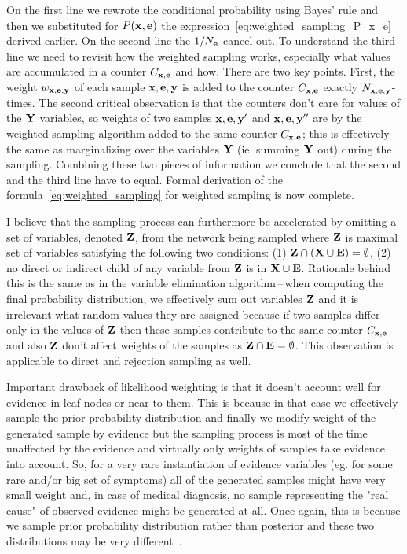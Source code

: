 \documentclass[english,cover]{fitthesis} %
\newcommand{\vars}[1]{{\bold{#1}}}         %
\begin{document}
On the first line we rewrote the conditional probability using Bayes' rule and then we substituted for $P(\vars{x},\vars{e})$ the expression~\eqref{eq:weighted_sampling_P_x_e} derived earlier.
On the second line the $1/N_\vars{e}$ cancel out.
To understand the third line we need to revisit how the weighted sampling works, especially what values are accumulated in a counter $C_{\vars{x},\vars{e}}$ and how. There are two key points. First, the weight $w_{\vars{x},\vars{e},\vars{y}}$ of each sample $\vars{x},\vars{e},\vars{y}$ is added to the counter $C_{\vars{x},\vars{e}}$ exactly $N_{\vars{x},\vars{e},\vars{y}}$-times. The second critical observation is that the counters don't care for values of the $\vars{Y}$ variables, so weights of two samples $\vars{x},\vars{e},\vars{y'}$ and $\vars{x},\vars{e},\vars{y''}$ are by the weighted sampling algorithm added to the same counter $C_{\vars{x},\vars{e}}$; this is effectively the same as marginalizing over the variables $\vars{Y}$ (ie. summing $\vars{Y}$ out) during the sampling.
  Combining these two pieces of information we conclude that the second and the third line have to equal. Formal derivation of the formula~\eqref{eq:weighted_sampling} for weighted sampling is now complete.

\medskip

I believe that the sampling process can furthermore be accelerated by omitting a set of variables, denoted $\vars{Z}$, from the network being sampled where $\vars{Z}$ is maximal set of variables satisfying the following two conditions: (1) $\vars{Z} \cap (\vars{X} \cup \vars{E}) = \emptyset$, (2) no direct or indirect child of any variable from $\vars{Z}$ is in $\vars{X} \cup \vars{E}$. Rationale behind this is the same as in the variable elimination algorithm\,--\,when computing the final probability distribution, we effectively sum out variables $\vars{Z}$ and it is irrelevant what random values they are assigned because if two samples differ only in the values of $\vars{Z}$ then these samples contribute to the same counter $C_{\vars{x},\vars{e}}$ and also $\vars{Z}$ don't affect weights of the samples as $\vars{Z} \cap \vars{E} = \emptyset$. This observation is applicable to direct and rejection sampling as well.

Important drawback of likelihood weighting is that it doesn't account well for evidence in leaf nodes or near to them. This is because in that case we effectively sample the prior probability distribution and finally we modify weight of the generated sample by evidence but the sampling process is most of the time unaffected by the evidence and virtually only weights of samples take evidence into account. So, for a very rare instantiation of evidence variables (eg. for some rare and/or big set of symptoms) all of the generated samples might have very small weight and, in case of medical diagnosis, no sample representing the "real cause" of observed evidence might be generated at all. Once again, this is because we sample prior probability distribution rather than posterior and these two distributions may be very different~\cite[p.~503]{pgm}.
\end{document}
